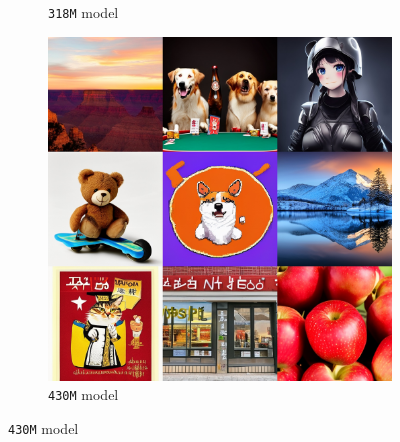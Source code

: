 \begin{figure}[!t]
\begin{subfigure}[b]{0.32\textwidth}
    \caption{\texttt{318M} model}
    \end{subfigure}
    \begin{subfigure}[b]{0.32\textwidth}
    \centering
    \includegraphics[width=\textwidth]{cp2/figures/t2i/c224.jpg}
    \caption{\texttt{430M} model}
    \end{subfigure}
    \hfill
    

\end{figure}

